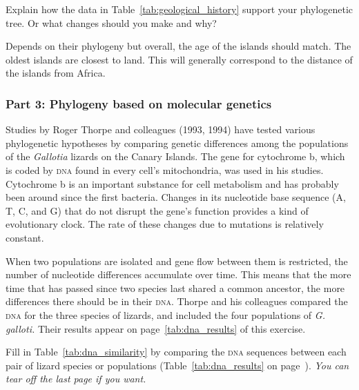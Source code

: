 \documentclass[12pt, hidelinks]{exam}
\newcommand*\AnswerBox[2]{%
    \parbox[t][#1]{0.92\textwidth}{%
    \begin{solution}#2\end{solution}}
    \vspace{\stretch{1}}
}
\begin{document}
\begin{questions}

\question
Explain how the data in Table~\ref{tab:geological_history} support your phylogenetic tree. Or what changes should you make and why?

\AnswerBox{2\baselineskip}{Depends on their phylogeny but overall, the age of the islands should match. 
The oldest islands are closest to land. This will generally correspond to the distance of the islands from Africa.}

\subsubsection*{Part 3: Phylogeny based on molecular genetics}

Studies by Roger Thorpe and colleagues (1993, 1994) have tested various phylogenetic hypotheses by comparing genetic differences among the populations of the \textit{Gallotia} lizards on the Canary Islands. The gene for cytochrome b, which is coded by \textsc{dna} found in every cell’s mitochondria, was used in his studies. Cytochrome b is an important substance for cell metabolism and has probably been around since the first bacteria. Changes in its nucleotide base sequence (\textsc{A, T, C,} and \textsc{G}) that do not disrupt the gene’s function provides a kind of evolutionary clock. The rate of these changes due to mutations is relatively constant. 

When two populations are isolated and gene flow between them is restricted, the number of nucleotide differences accumulate over time. This means that the more time that has passed since two species last shared a common ancestor, the more differences there should be in their \textsc{dna.}  Thorpe and his colleagues compared the \textsc{dna} for the three species of lizards, and included the four populations of \textit{G. galloti.} Their results appear on page~\ref{tab:dna_results} of this exercise. 

\question
Fill in Table~\ref{tab:dna_similarity} by comparing the \textsc{dna} sequences between each pair of lizard species or populations (Table~\ref{tab:dna_results} on page~\pageref{tab:dna_results}). \emph{You can tear off the last page if you want.}

\vspace{\baselineskip}

{
	}
\end{questions}
\end{document}

